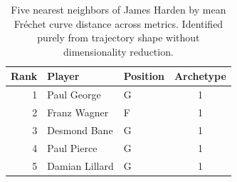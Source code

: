 \begin{table}[htbp]
  \centering\small
  \begin{tabular}{rllc}
    \toprule
    Rank & Player & Position & Archetype \\
    \midrule
    1 & Paul George & G & 1 \\
    2 & Franz Wagner & F & 1 \\
    3 & Desmond Bane & G & 1 \\
    4 & Paul Pierce & G & 1 \\
    5 & Damian Lillard & G & 1 \\
    \bottomrule
  \end{tabular}
  \caption{Five nearest neighbors of James Harden by mean Fr\'{e}chet curve distance across metrics. Identified purely from trajectory shape without dimensionality reduction.}
  \label{tab:James_Harden_frechet_curve_neighbors}
\end{table}

